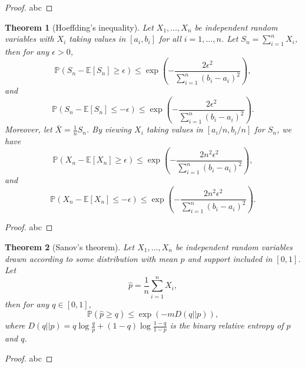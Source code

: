 \documentclass[openany,12pt]{book}
\newtheorem{theorem}{Theorem}[chapter]
\begin{document}
\begin{proof}
  abc
\end{proof}

\begin{theorem}[Hoeffding's inequality]
  Let $X_1,\dots,X_n$ be independent random variables with $X_i$ taking values in $[a_i, b_i]$ for all $i=1,\dots,n$. Let $S_n=\sum_{i=1}^{n}X_i$, then for any $\epsilon>0$,
  \begin{equation}
    \mathbb{P}(S_n-\mathbb{E}[S_n]\geqslant\epsilon)\leqslant \exp\left(-\frac{2\epsilon^2}{\sum_{i=1}^{n}(b_i-a_i)^2}\right),
  \end{equation}
  and
  \begin{equation}
    \mathbb{P}(S_n-\mathbb{E}[S_n]\leqslant-\epsilon)\leqslant \exp\left(-\frac{2\epsilon^2}{\sum_{i=1}^{n}(b_i-a_i)^2}\right).
  \end{equation}
  Moreover, let $\bar{X}=\frac{1}{n}S_n$. By viewing $X_i$ taking values in $[a_i/n, b_i/n]$ for $S_n$, we have
  \begin{equation}
    \mathbb{P}(X_n-\mathbb{E}[X_n]\geqslant\epsilon)\leqslant \exp\left(-\frac{2n^2\epsilon^2}{\sum_{i=1}^{n}(b_i-a_i)^2}\right),
  \end{equation}
  and
  \begin{equation}
    \mathbb{P}(X_n-\mathbb{E}[X_n]\leqslant-\epsilon)\leqslant \exp\left(-\frac{2n^2\epsilon^2}{\sum_{i=1}^{n}(b_i-a_i)^2}\right).
  \end{equation}
\end{theorem}

\begin{proof}
  abc
\end{proof}

\begin{theorem}[Sanov's theorem]
  Let $X_1,\dots,X_n$ be independent random variables drawn according to some distribution with mean $p$ and support included in $[0, 1]$. Let $$\hat{p}=\frac{1}{n}\sum_{i=1}^{n}X_i,$$ then for any $q\in[0, 1]$,
  \begin{equation}
    \mathbb{P}(\hat{p}\geqslant q)\leqslant\exp(-mD(q||p)),
  \end{equation}
  where $D(q||p)=q\log\frac{q}{p}+(1-q)\log\frac{1-q}{1-p}$ is the binary relative entropy of $p$ and $q$.
\end{theorem}

\begin{proof}
  abc
\end{proof}
\end{document}
